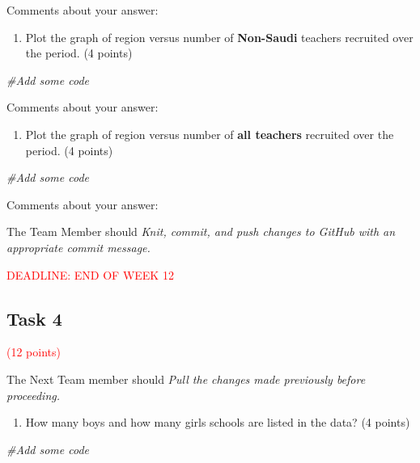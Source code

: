 \documentclass[
]{article}
\newenvironment{Shaded}{\begin{snugshade}}{\end{snugshade}}
\newcommand{\CommentTok}[1]{\textcolor[rgb]{0.56,0.35,0.01}{\textit{#1}}}
\providecommand{\tightlist}{%
  \setlength{\itemsep}{0pt}\setlength{\parskip}{0pt}}
\begin{document}
Comments about your answer:

\begin{enumerate}
\def\labelenumi{(\alph{enumi})}
\setcounter{enumi}{3}
\tightlist
\item
  Plot the graph of region versus number of \textbf{Non-Saudi} teachers
  recruited over the period. (4 points)
\end{enumerate}

\begin{Shaded}
\begin{Highlighting}[]
\CommentTok{\#Add some code}
\end{Highlighting}
\end{Shaded}

Comments about your answer:

\begin{enumerate}
\def\labelenumi{(\alph{enumi})}
\setcounter{enumi}{4}
\tightlist
\item
  Plot the graph of region versus number of \textbf{all teachers}
  recruited over the period. (4 points)
\end{enumerate}

\begin{Shaded}
\begin{Highlighting}[]
\CommentTok{\#Add some code}
\end{Highlighting}
\end{Shaded}

Comments about your answer:

The Team Member should \emph{Knit, commit, and push changes to GitHub
with an appropriate commit message.}

\textcolor{red}{DEADLINE: END OF WEEK 12}

\hypertarget{task-4}{%
\subsection{Task 4}\label{task-4}}

\textcolor{red}{(12 points)}

The Next Team member should \emph{Pull the changes made previously
before proceeding.}

\begin{enumerate}
\def\labelenumi{(\alph{enumi})}
\tightlist
\item
  How many boys and how many girls schools are listed in the data? (4
  points)
\end{enumerate}

\begin{Shaded}
\begin{Highlighting}[]
\CommentTok{\#Add some code}
\end{Highlighting}
\end{Shaded}
\end{document}
